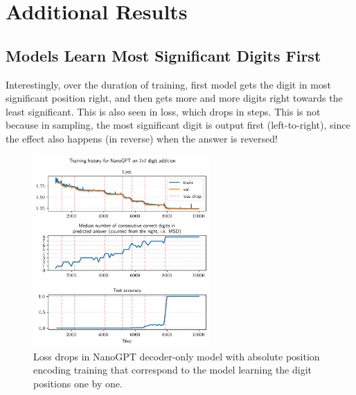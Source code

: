 \chapter{Additional Results}\label{app:additional_results}


\section{Models Learn Most Significant Digits First}
Interestingly, over the duration of training, first model gets the digit in most significant position right, and then gets more and more digits right towards the least significant. This is also seen in loss, which drops in steps. This is not because in sampling, the most significant digit is output first (left-to-right), since the effect also happens (in reverse) when the answer is reversed!

\begin{figure}[ht]
    \centering
    \includegraphics[width=0.6\textwidth]{fig/digitwise_loss.png}
    \caption{Loss drops in NanoGPT decoder-only model with absolute position encoding training that correspond to the model learning the digit positions one by one.}
    \label{fig:digitwise_loss}
\end{figure}
